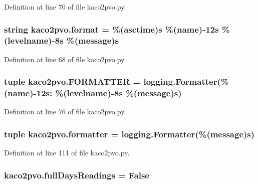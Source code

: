 Definition at line 70 of file kaco2pvo.\+py.

\hypertarget{namespacekaco2pvo_a8e0cef267ad3a400b70c9411a08cec1a}{}
\subsubsection[{format}]{\setlength{\rightskip}{0pt plus 5cm}string kaco2pvo.\+format = \textquotesingle{}\%(asctime)s \%(name)-\/12s \%(levelname)-\/8s \%(message)s\textquotesingle{}}\label{namespacekaco2pvo_a8e0cef267ad3a400b70c9411a08cec1a}


Definition at line 68 of file kaco2pvo.\+py.

\hypertarget{namespacekaco2pvo_ae338ae856d783c3f2f8636a2c3fb397f}{}
\subsubsection[{F\+O\+R\+M\+A\+T\+T\+E\+R}]{\setlength{\rightskip}{0pt plus 5cm}tuple kaco2pvo.\+F\+O\+R\+M\+A\+T\+T\+E\+R = logging.\+Formatter(\textquotesingle{}\%(name)-\/12s\+: \%(levelname)-\/8s \%(message)s\textquotesingle{})}\label{namespacekaco2pvo_ae338ae856d783c3f2f8636a2c3fb397f}


Definition at line 76 of file kaco2pvo.\+py.

\hypertarget{namespacekaco2pvo_acc7f29a549e72ad45ff6e4e2d1410219}{}
\subsubsection[{formatter}]{\setlength{\rightskip}{0pt plus 5cm}tuple kaco2pvo.\+formatter = logging.\+Formatter(\textquotesingle{}\%(message)s\textquotesingle{})}\label{namespacekaco2pvo_acc7f29a549e72ad45ff6e4e2d1410219}


Definition at line 111 of file kaco2pvo.\+py.

\hypertarget{namespacekaco2pvo_aae937eda0631ecf6afcfc425a4dd234d}{}
\subsubsection[{full\+Days\+Readings}]{\setlength{\rightskip}{0pt plus 5cm}kaco2pvo.\+full\+Days\+Readings = False}\label{namespacekaco2pvo_aae937eda0631ecf6afcfc425a4dd234d}


